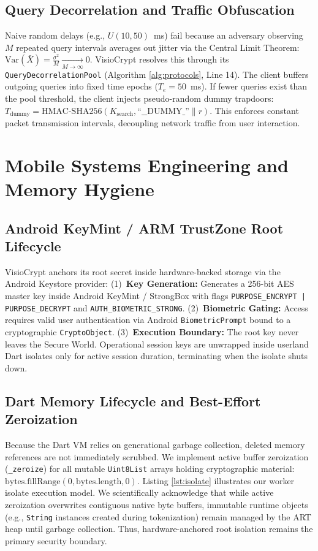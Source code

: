 \documentclass[10pt,conference]{IEEEtran}
\newenvironment{revised}{\color{revcolor}}{}
\begin{document}
\begin{revised}
\subsection{Query Decorrelation and Traffic Obfuscation}
Naive random delays (e.g., $U(10, 50)$~ms) fail because an adversary observing $M$ repeated query intervals averages out jitter via the Central Limit Theorem: $\text{Var}(\bar{X}) = \frac{\sigma^2}{M} \xrightarrow[M \to \infty]{} 0$. VisioCrypt resolves this through its \texttt{QueryDecorrelationPool} (Algorithm \ref{alg:protocols}, Line 14). The client buffers outgoing queries into fixed time epochs ($T_e = 50$~ms). If fewer queries exist than the pool threshold, the client injects pseudo-random dummy trapdoors: $T_{\text{dummy}} = \text{HMAC-SHA256}(K_{\text{search}}, \text{``\_\_DUMMY\_''}\parallel r)$. This enforces constant packet transmission intervals, decoupling network traffic from user interaction.

\section{Mobile Systems Engineering and Memory Hygiene}
\subsection{Android KeyMint / ARM TrustZone Root Lifecycle}
VisioCrypt anchors its root secret inside hardware-backed storage via the Android Keystore provider: (1)~\textbf{Key Generation:} Generates a 256-bit AES master key inside Android KeyMint / StrongBox with flags \texttt{PURPOSE\_ENCRYPT | PURPOSE\_DECRYPT} and \texttt{AUTH\_BIOMETRIC\_STRONG}. (2)~\textbf{Biometric Gating:} Access requires valid user authentication via Android \texttt{BiometricPrompt} bound to a cryptographic \texttt{CryptoObject}. (3)~\textbf{Execution Boundary:} The root key never leaves the Secure World. Operational session keys are unwrapped inside userland Dart isolates only for active session duration, terminating when the isolate shuts down.

\subsection{Dart Memory Lifecycle and Best-Effort Zeroization}
Because the Dart VM relies on generational garbage collection, deleted memory references are not immediately scrubbed. We implement active buffer zeroization (\texttt{\_zeroize}) for all mutable \texttt{Uint8List} arrays holding cryptographic material: $\text{bytes.fillRange}(0, \text{bytes.length}, 0)$. Listing \ref{lst:isolate} illustrates our worker isolate execution model. We scientifically acknowledge that while active zeroization overwrites contiguous native byte buffers, immutable runtime objects (e.g., \texttt{String} instances created during tokenization) remain managed by the ART heap until garbage collection. Thus, hardware-anchored root isolation remains the primary security boundary.


\end{revised}
\end{document}
